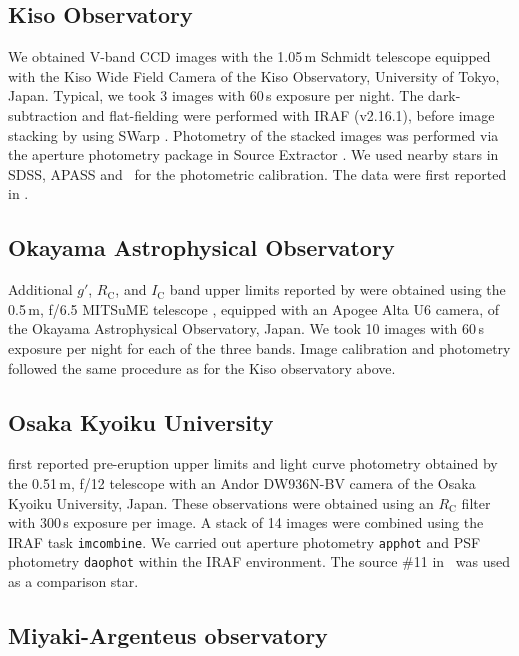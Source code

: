 \documentclass[twocolumn,tighten]{aastex6}
\newcommand{\othreek}{\citetalias{2016ApJ...833..149D}}
\begin{document}
\subsection{Kiso Observatory}

We obtained V-band CCD images with the 1.05\,m Schmidt telescope equipped with the Kiso Wide Field Camera \citep{2012SPIE.8446E..6LS} of the Kiso Observatory, University of Tokyo, Japan. Typical, we took 3 images with 60\,s exposure per night. The dark-subtraction and flat-fielding were performed with IRAF (v2.16.1), before image stacking by using SWarp \citep[v2.19.1][]{2002ASPC..281..228B}. Photometry of the stacked images was performed via the aperture photometry package in Source Extractor \citep[v2.8.6;][]{1996A&AS..117..393B}. We used nearby stars in SDSS, APASS \citep{2016yCat.2336....0H} and \othreek\ for the photometric calibration. The data were first reported in \citet{2016ATel.9891....1N}.

\subsection{Okayama Astrophysical Observatory}

Additional $g'$, $R_\mathrm{C}$, and $I_\mathrm{C}$ band upper limits reported by \citet{2016ATel.9891....1N} were obtained using the 0.5\,m, f/6.5 MITSuME telescope \citep{2005NCimC..28..755K}, equipped with an Apogee Alta U6 camera, of the Okayama Astrophysical Observatory, Japan. We took 10 images with
60\,s exposure per night for each of the three bands. Image calibration and photometry followed the same procedure as for the Kiso observatory above.

\subsection{Osaka Kyoiku University}

\citet{2016ATel.9891....1N} first reported pre-eruption upper limits and light curve photometry obtained by the 0.51\,m, f/12 telescope with an Andor DW936N-BV camera of the Osaka Kyoiku University, Japan. These observations were obtained using an $R_\mathrm{C}$ filter with 300\,s exposure per image. A stack of 14 images were combined using the IRAF task \texttt{imcombine}. We carried out aperture photometry \texttt{apphot} and PSF photometry \texttt{daophot} within the IRAF environment. The source \#11 in \othreek\ was used as a comparison star.

\subsection{Miyaki-Argenteus observatory}
\end{document}
